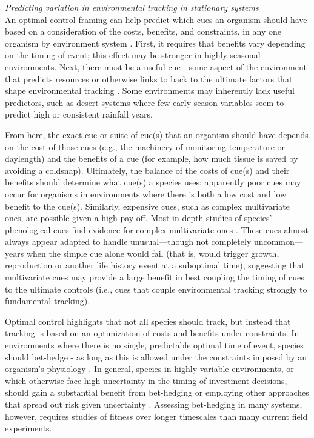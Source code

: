 \documentclass[11pt,letterpaper]{article}
\newcommand{\R}[1]{\label{#1}\linelabel{#1}}
\begin{document}
\emph{Predicting variation in environmental tracking in stationary systems}\\
\R{constrain1start} An optimal control framing can help predict which cues an organism should have based on a consideration of the costs, benefits, and constraints, in any one organism by environment system \citep{donahue2015}. First, it requires that benefits vary depending on the timing of event; this effect may be stronger in highly seasonal environments. Next, there must be a useful cue---some aspect of the environment that predicts resources or otherwise links to back to the ultimate factors that shape environmental tracking \citep{gremer2016}. Some environments may inherently lack useful predictors, such as desert systems where few early-season variables seem to predict high or consistent rainfall years. 

From here, the exact cue or suite of cue(s) that an organism should have depends on the cost of those cues (e.g., the machinery of monitoring temperature or daylength) and the benefits of a cue (for example, how much tissue is saved by avoiding a coldsnap). Ultimately, the balance of the costs of cue(s) and their benefits should determine what cue(s) a species uses: apparently poor cues may occur for organisms in environments where there is both a low cost and low benefit to the cue(s). Similarly, expensive cues, such as complex multivariate ones, are possible given a high pay-off. Most in-depth studies of species' phenological cues find evidence for complex multivariate ones \citep{chuinearees}. These cues almost always appear adapted to handle unusual---though not completely uncommon---years when the simple cue alone would fail (that is, would trigger growth, reproduction or another life history event at a suboptimal time), suggesting that multivariate cues may provide a large benefit in best coupling the timing of cues to the ultimate controls (i.e., cues that couple environmental tracking strongly to fundamental tracking). 

\R{bh1start}Optimal control highlights that not all species should track, but instead that tracking is based on an optimization of costs and benefits under constraints. In environments where there is no single, predictable optimal time of event, species should bet-hedge - as long as this is allowed under the constraints imposed by an organism's physiology \citep{decasas2015}. In general, species in highly variable environments, or which otherwise face high uncertainty in the timing of investment decisions, should gain a substantial benefit from bet-hedging or employing other approaches that spread out risk given uncertainty \citep{Venable:2007os,donald2013}. Assessing bet-hedging in many systems, however, requires studies of fitness over longer timescales than many current field experiments.\R{bh1end} %
\end{document}
